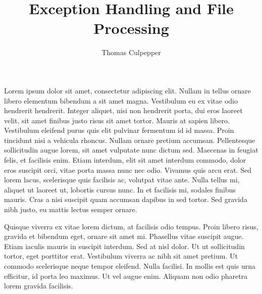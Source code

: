 \documentclass[\pandocDocMode,longtable, floatsintext, noextraspace]{apa6}
\title{Exception Handling and File Processing}
\author{Thomas Culpepper}
\affiliation{CSC310 Module 1 Case\\Trident University International}
\begin{document}
\maketitle

Lorem ipsum dolor sit amet, consectetur adipiscing elit. Nullam in
tellus ornare libero elementum bibendum a sit amet magna. Vestibulum eu
ex vitae odio hendrerit hendrerit. Integer aliquet, nisi non hendrerit
porta, dui eros laoreet velit, sit amet finibus justo risus sit amet
tortor. Mauris at sapien libero. Vestibulum eleifend purus quis elit
pulvinar fermentum id id massa. Proin tincidunt nisi a vehicula rhoncus.
Nullam ornare pretium accumsan. Pellentesque sollicitudin augue lorem,
sit amet vulputate nunc dictum sed. Maecenas in feugiat felis, et
facilisis enim. Etiam interdum, elit sit amet interdum commodo, dolor
eros suscipit orci, vitae porta massa nunc nec odio. Vivamus quis arcu
erat. Sed lorem lacus, scelerisque quis facilisis ac, volutpat vitae
ante. Nulla tellus mi, aliquet ut laoreet ut, lobortis cursus nunc. In
et facilisis mi, sodales finibus mauris. Cras a nisi suscipit quam
accumsan dapibus in sed tortor. Sed gravida nibh justo, eu mattis lectus
semper ornare.

Quisque viverra ex vitae lorem dictum, at facilisis odio tempus. Proin
libero risus, gravida et bibendum eget, ornare sit amet mi. Phasellus
vitae suscipit augue. Etiam iaculis mauris in suscipit interdum. Sed at
nisl dolor. Ut ut sollicitudin tortor, eget porttitor erat. Vestibulum
viverra ac nibh sit amet pretium. Ut commodo scelerisque neque tempor
eleifend. Nulla facilisi. In mollis est quis urna efficitur, id porta
leo maximus. Ut vel augue enim. Aliquam non odio pharetra lorem gravida
facilisis.
\end{document}
